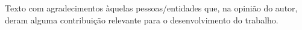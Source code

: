 
\begin{agradecimentos}
Texto com agradecimentos àquelas pessoas/entidades que, na opinião do autor, deram alguma contribuição relevante para o desenvolvimento do trabalho.
\end{agradecimentos}